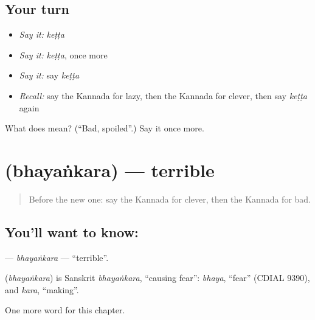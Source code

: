 \subsection*{Your turn}
\begin{itemize}
\raggedright
  \item \emph{Say it:} \emph{keṭṭa}
  \item \emph{Say it:} \emph{keṭṭa}, once more
  \item \emph{Say it:} say \emph{keṭṭa}
  \item \emph{Recall:} say the Kannada for lazy, then the Kannada for clever, then say \emph{keṭṭa} again
\end{itemize}

\begin{tcolorbox}[breakable,colback=teal!4,colframe=teal!35!black,title={Before you move on}]
What does  mean? (\textquotedblleft{}Bad, spoiled\textquotedblright{}.) Say it once more.
\end{tcolorbox}
\section[\texorpdfstring{\kn{ಭಯಂಕರ} (bhayaṅkara)}{ಭಯಂಕರ (bhayaṅkara)}]{ (bhayaṅkara) — terrible}

\label{lesson:KA-C146-bhayankara}



\begin{quote}
Before the new one: say the Kannada for clever, then the Kannada for bad.
\end{quote}

\subsection*{You'll want to know: }
\textbf{} — \emph{bhayaṅkara} — \textquotedblleft{}terrible\textquotedblright{}.

\begin{cousinweb}
\textbf{} (\emph{bhayaṅkara}) is Sanskrit \emph{bhayaṅkara}, \textquotedblleft{}causing fear\textquotedblright{}: \emph{bhaya}, \textquotedblleft{}fear\textquotedblright{} (CDIAL 9390), and \emph{kara}, \textquotedblleft{}making\textquotedblright{}.
\end{cousinweb}

\begin{grammarlens}[title={What you've built}]
One more word for this chapter.
\end{grammarlens}

